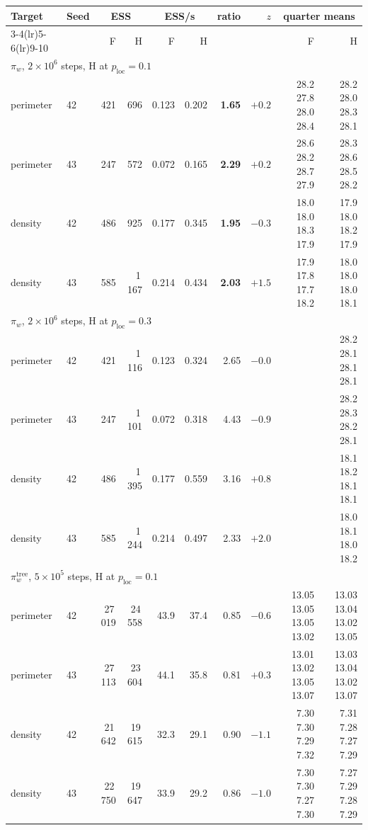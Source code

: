 \documentclass[11pt]{article}
\begin{document}
\begin{table}[htbp]
\centering
\footnotesize
\setlength{\tabcolsep}{4pt}
\begin{tabular}{llrrrrrrrr}
\toprule
Target & Seed & \multicolumn{2}{c}{ESS} & \multicolumn{2}{c}{ESS/s} & ratio & $z$ & \multicolumn{2}{c}{quarter means} \\
\cmidrule(lr){3-4}\cmidrule(lr){5-6}\cmidrule(lr){9-10}
 & & F & H & F & H & & & F & H \\
\midrule
\multicolumn{10}{l}{$\pi_w$, $2 \times 10^6$ steps, H at $p_{\mathrm{loc}} = 0.1$} \\
perimeter & 42 & 421 & 696 & 0.123 & 0.202 & \textbf{1.65} & $+0.2$ & 28.2 27.8 28.0 28.4 & 28.2 28.0 28.3 28.1 \\
perimeter & 43 & 247 & 572 & 0.072 & 0.165 & \textbf{2.29} & $+0.2$ & 28.6 28.2 28.7 27.9 & 28.3 28.6 28.5 28.2 \\
density & 42 & 486 & 925 & 0.177 & 0.345 & \textbf{1.95} & $-0.3$ & 18.0 18.0 18.3 17.9 & 17.9 18.0 18.2 17.9 \\
density & 43 & 585 & 1\,167 & 0.214 & 0.434 & \textbf{2.03} & $+1.5$ & 17.9 17.8 17.7 18.2 & 18.0 18.0 18.0 18.1 \\
\multicolumn{10}{l}{$\pi_w$, $2 \times 10^6$ steps, H at $p_{\mathrm{loc}} = 0.3$} \\
perimeter & 42 & 421 & 1\,116 & 0.123 & 0.324 & 2.65 & $-0.0$ & & 28.2 28.1 28.1 28.1 \\
perimeter & 43 & 247 & 1\,101 & 0.072 & 0.318 & 4.43 & $-0.9$ & & 28.2 28.3 28.2 28.1 \\
density & 42 & 486 & 1\,395 & 0.177 & 0.559 & 3.16 & $+0.8$ & & 18.1 18.2 18.1 18.1 \\
density & 43 & 585 & 1\,244 & 0.214 & 0.497 & 2.33 & $+2.0$ & & 18.0 18.1 18.0 18.2 \\
\multicolumn{10}{l}{$\pi_w^{\mathrm{tree}}$, $5 \times 10^5$ steps, H at $p_{\mathrm{loc}} = 0.1$} \\
perimeter & 42 & 27\,019 & 24\,558 & 43.9 & 37.4 & 0.85 & $-0.6$ & 13.05 13.05 13.05 13.02 & 13.03 13.04 13.02 13.05 \\
perimeter & 43 & 27\,113 & 23\,604 & 44.1 & 35.8 & 0.81 & $+0.3$ & 13.01 13.02 13.05 13.07 & 13.03 13.04 13.02 13.07 \\
density & 42 & 21\,642 & 19\,615 & 32.3 & 29.1 & 0.90 & $-1.1$ & 7.30 7.30 7.29 7.32 & 7.31 7.28 7.27 7.29 \\
density & 43 & 22\,750 & 19\,647 & 33.9 & 29.2 & 0.86 & $-1.0$ & 7.30 7.30 7.27 7.30 & 7.27 7.29 7.28 7.29 \\

\end{tabular}
\end{table}
\end{document}
